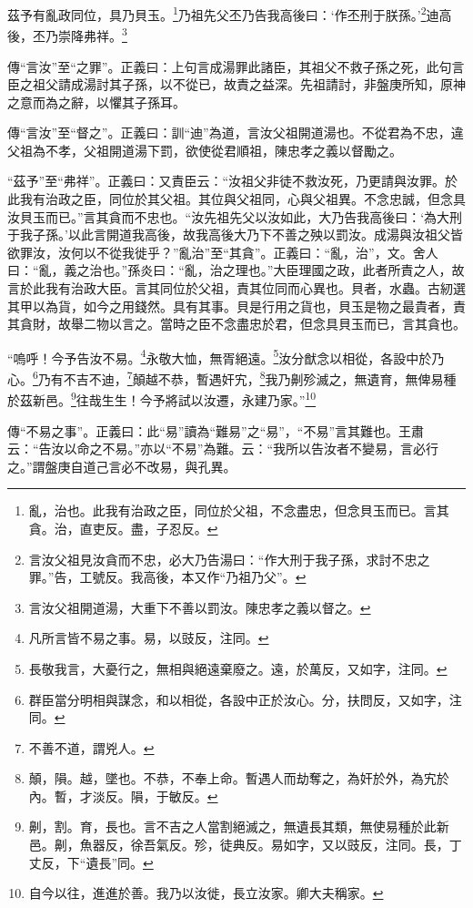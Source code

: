 茲予有亂政同位，具乃貝玉。\footnote{亂，治也。此我有治政之臣，同位於父祖，不念盡忠，但念貝玉而已。言其貪。治，直吏反。盡，子忍反。}乃祖先父丕乃告我高後曰：‘作丕刑于朕孫。’\footnote{言汝父祖見汝貪而不忠，必大乃告湯曰：“作大刑于我子孫，求討不忠之罪。”告，工號反。我高後，本又作“乃祖乃父”。}迪高後，丕乃崇降弗祥。\footnote{言汝父祖開道湯，大重下不善以罰汝。陳忠孝之義以督之。}


{\noindent\zhuan{}\fzbyks 傳“言汝”至“之罪”。正義曰：上句言成湯罪此諸臣，其祖父不救子孫之死，此句言臣之祖父請成湯討其子孫，以不從已，故責之益深。先祖請討，非盤庚所知，原神之意而為之辭，以懼其子孫耳。 \par}

{\noindent\zhuan{}\fzbyks 傳“言汝”至“督之”。正義曰：訓“迪”為道，言汝父祖開道湯也。不從君為不忠，違父祖為不孝，父祖開道湯下罰，欲使從君順祖，陳忠孝之義以督勵之。 \par}

{\noindent\shu{}\fzkt “茲予”至“弗祥”。正義曰：又責臣云：“汝祖父非徒不救汝死，乃更請與汝罪。於此我有治政之臣，同位於其父祖。其位與父祖同，心與父祖異。不念忠誠，但念具汝貝玉而已。”言其貪而不忠也。“汝先祖先父以汝如此，大乃告我高後曰：‘為大刑于我子孫。’以此言開道我高後，故我高後大乃下不善之殃以罰汝。成湯與汝祖父皆欲罪汝，汝何以不從我徙乎？”亂治”至“其貪”。正義曰：“亂，治”，文。舍人曰：“亂，義之治也。”孫炎曰：“亂，治之理也。”大臣理國之政，此者所責之人，故言於此我有治政大臣。言其同位於父祖，責其位同而心異也。貝者，水蟲。古紉選其甲以為貨，如今之用錢然。具有其事。貝是行用之貨也，貝玉是物之最貴者，責其貪財，故舉二物以言之。當時之臣不念盡忠於君，但念具貝玉而已，言其貪也。 \par}

“嗚呼！今予告汝不易。\footnote{凡所言皆不易之事。易，以豉反，注同。}永敬大恤，無胥絕遠。\footnote{長敬我言，大憂行之，無相與絕遠棄廢之。遠，於萬反，又如字，注同。}汝分猷念以相從，各設中於乃心。\footnote{群臣當分明相與謀念，和以相從，各設中正於汝心。分，扶問反，又如字，注同。}乃有不吉不迪，\footnote{不善不道，謂兇人。}顛越不恭，暫遇奸宄，\footnote{顛，隕。越，墜也。不恭，不奉上命。暫遇人而劫奪之，為奸於外，為宄於內。暫，才淡反。隕，于敏反。}我乃劓殄滅之，無遺育，無俾易種於茲新邑。\footnote{劓，割。育，長也。言不吉之人當割絕滅之，無遺長其類，無使易種於此新邑。劓，魚器反，徐吾氣反。殄，徒典反。易如字，又以豉反，注同。長，丁丈反，下“遺長”同。}往哉生生！今予將試以汝遷，永建乃家。”\footnote{自今以往，進進於善。我乃以汝徙，長立汝家。卿大夫稱家。}

{\noindent\zhuan{}\fzbyks 傳“不易之事”。正義曰：此“易”讀為“難易”之“易”，“不易”言其難也。王肅云：“告汝以命之不易。”亦以“不易”為難。云：“我所以告汝者不變易，言必行之。”謂盤庚自道己言必不改易，與孔異。 \par}

